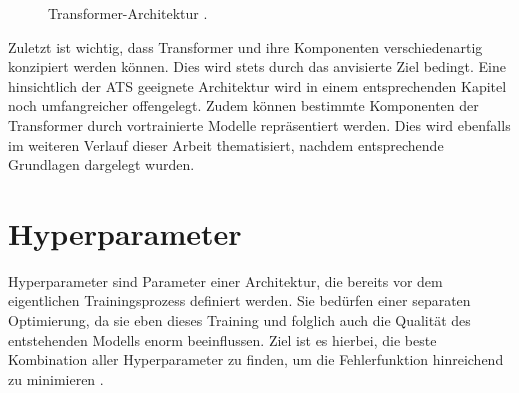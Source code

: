 \begin{figure}[h!]
  \centering
  \caption{Transformer-Architektur \cite[S.~3]{VAS17}.}
  \label{pic:TransformerArchitecture}
\end{figure}

\noindent
Zuletzt ist wichtig, dass Transformer und ihre Komponenten verschiedenartig konzipiert werden können. Dies wird stets durch das anvisierte Ziel bedingt. Eine hinsichtlich der \ac{ATS} geeignete Architektur wird in einem entsprechenden Kapitel noch umfangreicher offengelegt. Zudem können bestimmte Komponenten der Transformer durch vortrainierte Modelle repräsentiert werden. Dies wird ebenfalls im weiteren Verlauf dieser Arbeit thematisiert, nachdem entsprechende Grundlagen dargelegt wurden.
\newpage


\section{Hyperparameter}
\noindent
Hyperparameter sind Parameter einer Architektur, die bereits vor dem eigentlichen Trainingsprozess definiert werden. Sie bedürfen einer separaten Optimierung, da sie eben dieses Training und folglich auch die Qualität des entstehenden Modells enorm beeinflussen. Ziel ist es hierbei, die beste Kombination aller Hyperparameter zu finden, um die Fehlerfunktion hinreichend zu minimieren \cite[S.~1]{YAN20}.\\

